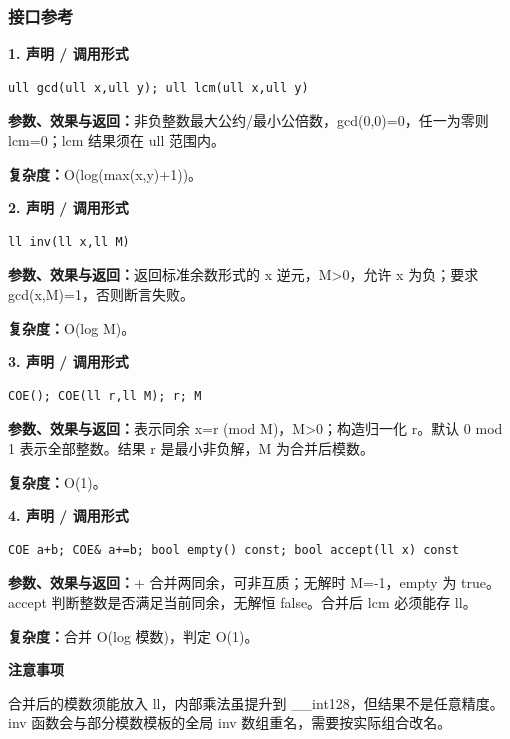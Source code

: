 \documentclass[UTF8,a4paper,10pt]{ctexart}
\newcommand{\TemplNote}[1]{\textbf{注意事项}\par #1\par}
\begin{document}
\subsubsection*{接口参考}
\noindent\begin{minipage}{\textwidth}
\textbf{1. 声明 / 调用形式}
\begin{lstlisting}
ull gcd(ull x,ull y); ull lcm(ull x,ull y)
\end{lstlisting}
\textbf{参数、效果与返回：}非负整数最大公约/最小公倍数，gcd(0,0)=0，任一为零则 lcm=0；lcm 结果须在 ull 范围内。

\textbf{复杂度：}O(log(max(x,y)+1))。

\end{minipage}\par\vspace{0.4em}
\noindent\begin{minipage}{\textwidth}
\textbf{2. 声明 / 调用形式}
\begin{lstlisting}
ll inv(ll x,ll M)
\end{lstlisting}
\textbf{参数、效果与返回：}返回标准余数形式的 x 逆元，M>0，允许 x 为负；要求 gcd(x,M)=1，否则断言失败。

\textbf{复杂度：}O(log M)。

\end{minipage}\par\vspace{0.4em}
\noindent\begin{minipage}{\textwidth}
\textbf{3. 声明 / 调用形式}
\begin{lstlisting}
COE(); COE(ll r,ll M); r; M
\end{lstlisting}
\textbf{参数、效果与返回：}表示同余 x=r (mod M)，M>0；构造归一化 r。默认 0 mod 1 表示全部整数。结果 r 是最小非负解，M 为合并后模数。

\textbf{复杂度：}O(1)。

\end{minipage}\par\vspace{0.4em}
\noindent\begin{minipage}{\textwidth}
\textbf{4. 声明 / 调用形式}
\begin{lstlisting}
COE a+b; COE& a+=b; bool empty() const; bool accept(ll x) const
\end{lstlisting}
\textbf{参数、效果与返回：}+ 合并两同余，可非互质；无解时 M=-1，empty 为 true。accept 判断整数是否满足当前同余，无解恒 false。合并后 lcm 必须能存 ll。

\textbf{复杂度：}合并 O(log 模数)，判定 O(1)。

\TemplNote{合并后的模数须能放入 ll，内部乘法虽提升到 \_\_int128，但结果不是任意精度。inv 函数会与部分模数模板的全局 inv 数组重名，需要按实际组合改名。}
\end{minipage}\par\vspace{0.4em}
\clearpage
\end{document}
